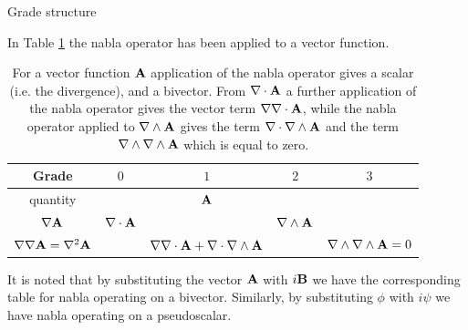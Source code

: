 \documentclass[handout,10pt]{beamer}
\begin{document}
\begin{frame}[shrink=10]{Grade structure}

In Table \ref{A_vector}  the nabla operator has been applied to a vector function.
\begin{table}[]
\centering
\caption{ For a vector function $\mathbf{A}$ application of the nabla operator gives a scalar  (i.e. the divergence), and a bivector. 
From $\nabla \cdot \mathbf{A}$ a further application of the nabla operator gives the vector term $\nabla \nabla \cdot \mathbf{A}$, while the nabla operator applied to
$\nabla \wedge \mathbf{A}$ gives the term $\nabla \cdot \nabla \wedge \mathbf{A} $ and the term $\nabla \wedge \nabla \wedge \mathbf{A} $ which is equal to zero.
}
\label{A_vector}
\begin{tabular}{| c | c | c | c | c |}
%
\hline
Grade & $0$ & $1$  & $2$ & $3$ \\
\hline
quantity &  & $\mathbf{A}$   &  &  \\ \hline
$\nabla \mathbf{A}$ & $\nabla \cdot \mathbf{A}$ &    & $\nabla \wedge \mathbf{A}$ &  \\ \hline
$\nabla \nabla \mathbf{A}= \nabla^2 \mathbf{A}$ & & $\nabla \nabla \cdot \mathbf{A} + \nabla \cdot \nabla \wedge \mathbf{A} $  &  & $\nabla \wedge \nabla \wedge \mathbf{A} =0$  \\ \hline
\end{tabular}
\end{table}

It is noted that by substituting the vector $\mathbf{A}$ with $i \mathbf{B}$ we have the corresponding table for nabla operating on a bivector. Similarly, by substituting $\phi$ with $i \psi$ we have nabla operating on a pseudoscalar.

\end{frame}

\end{document}
